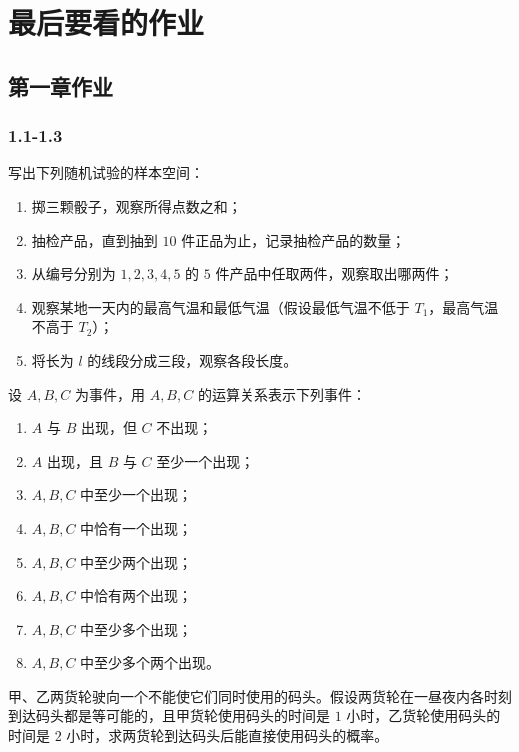 \chapter{最后要看的作业}
\section{第一章作业}
\subsection*{1.1-1.3}

\begin{homework}[1.1]
写出下列随机试验的样本空间：

\begin{enumerate}
  \item 掷三颗骰子，观察所得点数之和；
  \item 抽检产品，直到抽到 $10$ 件正品为止，记录抽检产品的数量；
  \item 从编号分别为 $1,2,3,4,5$ 的 $5$ 件产品中任取两件，观察取出哪两件；
  \item 观察某地一天内的最高气温和最低气温（假设最低气温不低于 $T_1$，最高气温不高于 $T_2$）；
  \item 将长为 $l$ 的线段分成三段，观察各段长度。
\end{enumerate}
\end{homework}

\begin{homework}[1.2]
设 $A,B,C$ 为事件，用 $A,B,C$ 的运算关系表示下列事件：

\begin{enumerate}
  \item $A$ 与 $B$ 出现，但 $C$ 不出现；
  \item $A$ 出现，且 $B$ 与 $C$ 至少一个出现；
  \item $A,B,C$ 中至少一个出现；
  \item $A,B,C$ 中恰有一个出现；
  \item $A,B,C$ 中至少两个出现；
  \item $A,B,C$ 中恰有两个出现；
  \item $A,B,C$ 中至少多个出现；
  \item $A,B,C$ 中至少多个两个出现。
\end{enumerate}
\end{homework}

\begin{homework}[1.12]
甲、乙两货轮驶向一个不能使它们同时使用的码头。假设两货轮在一昼夜内各时刻到达码头都是等可能的，且甲货轮使用码头的时间是 $1$ 小时，乙货轮使用码头的时间是 $2$ 小时，求两货轮到达码头后能直接使用码头的概率。
\end{homework}

